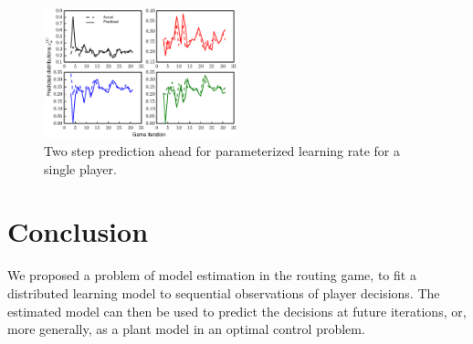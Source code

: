 \documentclass{sig-alternate-ipsn13}
\begin{document}



\begin{figure}
  \centering
  \includegraphics[width=0.5\textwidth]{images/two_steps_predictions}
  \caption{Two step prediction ahead for parameterized learning rate for a single player.}
  \label{fig:parameterized}
\end{figure}



\section{Conclusion}
\label{sec:conclusion}
We proposed a problem of model estimation in the routing game, to fit a distributed learning model to sequential observations of player decisions. The estimated model can then be used to predict the decisions at future iterations, or, more generally, as a plant model in an optimal control problem.
\end{document}
